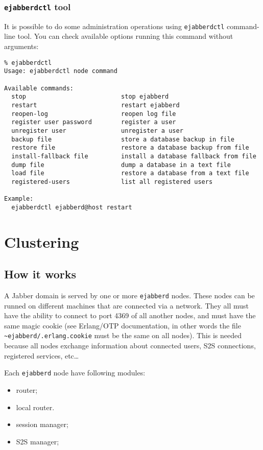 \documentclass[a4paper,10pt]{article}
\newcommand{\term}[1]{\texttt{#1}}
\newcommand{\ejabberd}{\texttt{ejabberd}}
\newcommand{\Jabber}{Jabber}
\begin{document}
\subsubsection{\term{ejabberdctl} tool}
\label{sec:ejabberdctl}

It is possible to do some administration operations using \term{ejabberdctl}
command-line tool.  You can check available options running this command
without arguments:
\begin{verbatim}
% ejabberdctl
Usage: ejabberdctl node command

Available commands:
  stop                          stop ejabberd
  restart                       restart ejabberd
  reopen-log                    reopen log file
  register user password        register a user
  unregister user               unregister a user
  backup file                   store a database backup in file
  restore file                  restore a database backup from file
  install-fallback file         install a database fallback from file
  dump file                     dump a database in a text file
  load file                     restore a database from a text file
  registered-users              list all registered users

Example:
  ejabberdctl ejabberd@host restart
\end{verbatim}



\section{Clustering}
\label{sec:clustering}


\subsection{How it works}
\label{sec:howitworks}

A \Jabber{} domain is served by one or more \ejabberd{} nodes.  These nodes can
be runned on different machines that are connected via a network.  They all
must have the ability to connect to port 4369 of all another nodes, and must
have the same magic cookie (see Erlang/OTP documentation, in other words the
file \term{\~{}ejabberd/.erlang.cookie} must be the same on all nodes). This is
needed because all nodes exchange information about connected users, S2S
connections, registered services, etc\ldots

Each \ejabberd{} node have following modules:
\begin{itemize}
\item router;
\item local router.
\item session manager;
\item S2S manager;
\end{itemize}
\end{document}
